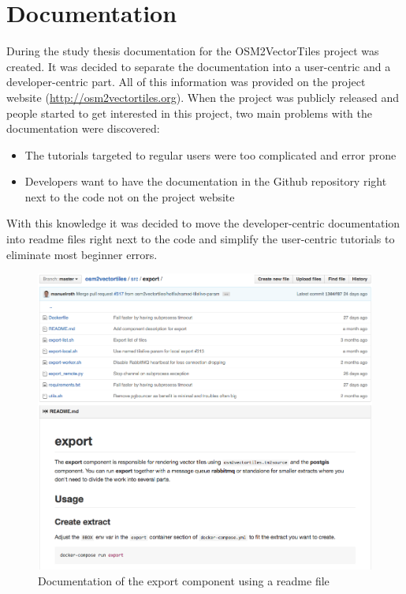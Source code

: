 \chapter{Documentation}

During the study thesis documentation for the OSM2VectorTiles project was created. It was decided to separate the documentation into a user-centric and a developer-centric part. All of this information was provided on the project website (\url{http://osm2vectortiles.org}). When the project was publicly released and people started to get interested in this project, two main problems with the documentation were discovered:

\begin{itemize}
    \item The tutorials targeted to regular users were too complicated and error prone
    \item Developers want to have the documentation in the Github repository right next to the code not on the project website
\end{itemize}

With this knowledge it was decided to move the developer-centric documentation into readme files right next to the code and simplify the user-centric tutorials to eliminate most beginner errors.

\begin{figure}[H]
  \centering
  \includegraphics[width=1.0\textwidth]{images/documentation/developer_documentation}
  \caption{Documentation of the export component using a readme file}
  \label{developer_documentation}
\end{figure}

